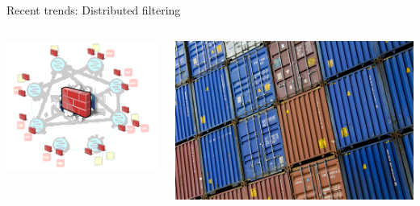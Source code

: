 \documentclass[black,white]{beamer}
\newcommand\sectioncolor{\setbeamercolor{background canvas}{bg=layerblue}}
\newcommand\newsectionpage[1]{
    \section{}
    {\sectioncolor
        \begin{frame}
            \vfill
            \centering
            \section{#1}
            \begin{beamercolorbox}[sep=8pt,center,shadow=true,rounded=true]{title}
                \usebeamerfont{title}\insertsectionhead\par%
            \end{beamercolorbox}
            \vfill
        \end{frame}
    }
    \section{#1}
}
\begin{document}


    \begin{frame}{Recent trends: Distributed filtering}
        \begin{columns}[c]
            \begin{column}{0.5\textwidth}
                \includegraphics[width=1.0\textwidth]{dfw.png}
            \end{column}
            \begin{column}{0.5\textwidth}
                \includegraphics[width=1.0\textwidth]{containers.jpg}

\end{column}
\end{columns}
\end{frame}
\end{document}
